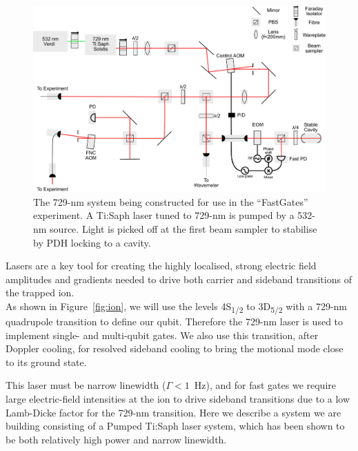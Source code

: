 \documentclass[12pt]{iopart}
\begin{document}
\begin{figure}
  \begin{center}
   \noindent\includegraphics[width=0.9\linewidth]{figures/729_path_small.pdf}
  \end{center}
  \caption{The 729-nm system being constructed for use in the
    ``FastGates'' experiment. A Ti:Saph laser tuned to 729-nm is
    pumped by a 532-nm source. Light is picked off at the first beam
    sampler to stabilise by PDH locking to a cavity.}
  \label{fig:729}
\end{figure}

Lasers are a key tool for creating the highly localised, strong
electric field amplitudes and gradients needed to drive both carrier
and sideband transitions of the trapped ion.\\
As shown in Figure~\ref{fig:ion}, we will use the levels
4S\textsubscript{1/2} to 3D\textsubscript{5/2} with a 729-nm
quadrupole transition to define our qubit. Therefore the 729-nm laser
is used to implement single- and multi-qubit gates. We also use this
transition, after Doppler cooling, for resolved sideband cooling to
bring the motional mode close to its ground state.

This laser must be narrow linewidth ($\Gamma < 1$~Hz), and for fast
gates we require large electric-field intensities at the ion to drive
sideband transitions due to a low Lamb-Dicke factor for the 729-nm
transition.  Here we describe a system we are building consisting of a
Pumped Ti:Saph laser system, which has been shown to be both
relatively high power and narrow linewidth.
\end{document}
